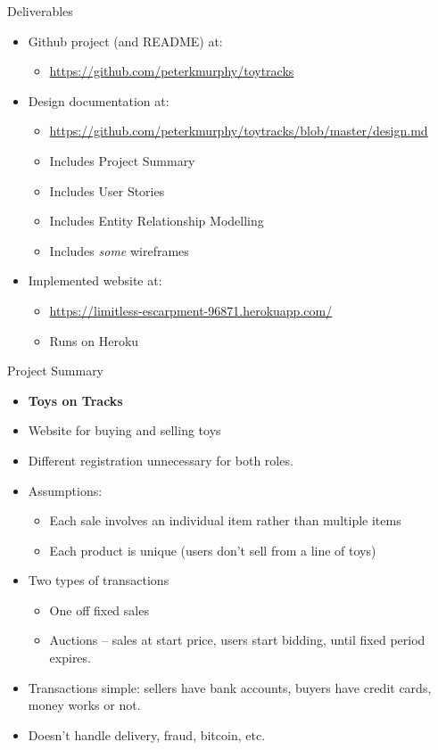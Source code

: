 \documentclass[10pt]{beamer}
\begin{document}
\begin{frame}[fragile]{Deliverables}

	\begin{itemize}
		\item Github project (and README) at:
    	\begin{itemize}
		\item \url{https://github.com/peterkmurphy/toytracks}
	\end{itemize}
		\item Design documentation at:
    	\begin{itemize}
		    \item \url{https://github.com/peterkmurphy/toytracks/blob/master/design.md}
    		\item Includes Project Summary
    		\item Includes User Stories
    		\item Includes Entity Relationship Modelling
    		\item Includes \emph{some} wireframes
	\end{itemize}
  \item Implemented website at:
      	\begin{itemize}
  \item \url{https://limitless-escarpment-96871.herokuapp.com/}
  \item Runs on Heroku
 	\end{itemize} 
	\end{itemize}

\end{frame}


\begin{frame}[fragile]{Project Summary}

	\begin{itemize}

\item \textbf{Toys on Tracks}
\item Website for buying and selling toys
\item Different registration unnecessary for both roles.
\item Assumptions: 
    	\begin{itemize}
\item Each sale involves an individual item rather than multiple items
\item Each product is unique (users don't sell from a line of toys)
	\end{itemize} 
\item Two types of transactions
    	\begin{itemize}
\item One off fixed sales
\item Auctions – sales at start price, users start bidding, until fixed period expires.
	\end{itemize} 
\item Transactions simple: sellers have bank accounts, buyers have credit cards, money works or not.
\item Doesn’t handle delivery, fraud, bitcoin, etc.

	\end{itemize}

\end{frame}
\end{document}

